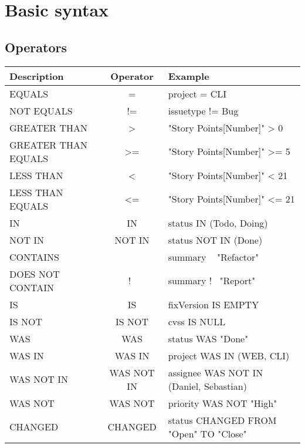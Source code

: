 \newpage
\chapter{Basic syntax}
\section{Operators}

\begin{center}
    \begin{tabular}{l c l}
        Description         & Operator   & Example                                 \\
        \hline\hline
        EQUALS              & =          & project = CLI                           \\
        NOT EQUALS          & !=         & issuetype != Bug                        \\
        GREATER THAN        & >          & "Story Points[Number]" > 0              \\
        GREATER THAN EQUALS & >=         & "Story Points[Number]" >= 5             \\
        LESS THAN           & <          & "Story Points[Number]" < 21             \\
        LESS THAN EQUALS    & <=         & "Story Points[Number]" <= 21            \\
        IN                  & IN         & status IN (Todo, Doing)                 \\
        NOT IN              & NOT IN     & status NOT IN (Done)                    \\
        CONTAINS            & ~          & summary ~ "Refactor"                    \\
        DOES NOT CONTAIN    & !~         & summary !~ "Report"                     \\
        IS                  & IS         & fixVersion IS EMPTY                     \\
        IS NOT              & IS NOT     & cvss IS NULL                            \\
        WAS                 & WAS        & status WAS "Done"                       \\
        WAS IN              & WAS IN     & project WAS IN (WEB, CLI)               \\
        WAS NOT IN          & WAS NOT IN & assignee WAS NOT IN (Daniel, Sebastian) \\
        WAS NOT             & WAS NOT    & priority WAS NOT "High"                 \\
        CHANGED             & CHANGED    & status CHANGED FROM "Open" TO "Close"
    \end{tabular}
\end{center}